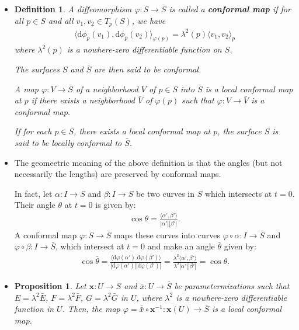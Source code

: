 \documentclass[10pt]{article}
\newtheorem{definition}[lemma]{Definition}
\newtheorem{proposition}[lemma]{Proposition}
\newcommand{\dee}{\mathrm{d}}
\newcommand{\ve}[1]{\mathbf{#1}}
\newcommand{\ra}{\rightarrow}
\begin{document}
  \begin{itemize}
    \item \begin{definition}
      A diffeomorphism $\varphi: S \ra \bar S$ is called a {\bf conformal map} if for all $p \in S$ and all $v_1, v_2 \in T_p(S)$, we have
      \begin{align*}
        \langle \dee \phi_p(v_1), \dee \phi_p(v_2) \rangle_{\varphi(p)} = \lambda^2(p) \langle v_1, v_2 \rangle_p
      \end{align*}
      where $\lambda^2(p)$ is a nowhere-zero differentiable function on $S$.

      The surfaces $S$ and $\bar S$ are then said to be conformal.

      A map $\varphi: V \ra \bar S$ of a neighborhood $V$ of $p \in S$ into $\bar S$ is a local conformal map at $p$ if there exists a neighborhood $\bar V$ of $\varphi(p)$ such that $\varphi: V \ra \bar V$ is a conformal map.

      If for each $p \in S$, there exists a local conformal map at $p$, the surface $S$ is said to be locally conformal to $\bar S$.
    \end{definition}

    \item The geomeetric meaning of the above definition is that the angles (but not necessarily the lengths) are preserved by conformal maps.

    In fact, let $\alpha : I \ra S$ and $\beta : I \ra S$ be two curves in $S$ which intersects at $t = 0$. Their angle $\theta$ at $t = 0$ is given by:
    \begin{align*}
      \cos \theta = \frac{\langle \alpha', \beta' \rangle}{| \alpha' | | \beta' |}.      
    \end{align*}    
    A conformal map $\varphi: S \ra \bar S$ maps these curves into curves $\varphi \circ \alpha: I \ra \bar S$ and $\varphi \circ \beta: I \ra \bar S$, which intersect at $t = 0$ and make an angle $\bar \theta$ given by:
    \begin{align*}
      \cos \bar\theta 
      = \frac{\langle \dee \varphi(\alpha'). \dee\varphi(\beta') \rangle }{|\dee\varphi(\alpha')||\dee\varphi(\beta')|}
      = \frac{\lambda^2 \langle \alpha', \beta' \rangle}{\lambda^2 |\alpha'| |\beta'|} = \cos \theta.
    \end{align*}

    \item \begin{proposition}
      Let $\ve{x}: U \ra S$ and $\bar x: U \ra \bar S$ be parametermizations such that $E = \lambda^2 \bar E$, $F = \lambda^2 \bar F$, $G = \lambda^2 \bar G$ in $U$, where $\lambda^2$ is a nowhere-zero differentiable function in $U$. Then, the map $\varphi = \bar{\bar{x}} \circ \ve{x}^{-1}: \ve{x}(U) \ra \bar S$ is a local conformal map.
    \end{proposition}


\end{itemize}
\end{document}
